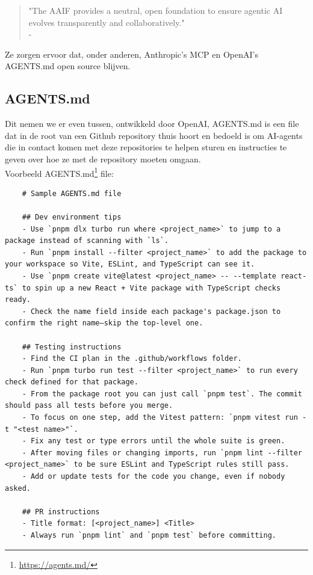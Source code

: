 \begin{quote}
    "The AAIF provides a neutral, open foundation to ensure agentic AI evolves transparently and collaboratively." \\
    - \autocite{LinuxFoundation2025}
\end{quote}

Ze zorgen ervoor dat, onder anderen, Anthropic's MCP en OpenAI's AGENTS.md open source blijven.

\subsection{AGENTS.md}
\label{ssec:agentsdotmd}
Dit nemen we er even tussen, ontwikkeld door OpenAI, AGENTS.md is een file dat in de root van een Github repository thuis hoort en bedoeld is om AI-agents die in contact komen met deze repositories te helpen sturen en instructies te geven over hoe ze met de repository moeten omgaan. \\

Voorbeeld AGENTS.md\footnote{\href{https://agents.md/}{https://agents.md/}} file:

\begin{verbatim}
    # Sample AGENTS.md file
    
    ## Dev environment tips
    - Use `pnpm dlx turbo run where <project_name>` to jump to a package instead of scanning with `ls`.
    - Run `pnpm install --filter <project_name>` to add the package to your workspace so Vite, ESLint, and TypeScript can see it.
    - Use `pnpm create vite@latest <project_name> -- --template react-ts` to spin up a new React + Vite package with TypeScript checks ready.
    - Check the name field inside each package's package.json to confirm the right name—skip the top-level one.
    
    ## Testing instructions
    - Find the CI plan in the .github/workflows folder.
    - Run `pnpm turbo run test --filter <project_name>` to run every check defined for that package.
    - From the package root you can just call `pnpm test`. The commit should pass all tests before you merge.
    - To focus on one step, add the Vitest pattern: `pnpm vitest run -t "<test name>"`.
    - Fix any test or type errors until the whole suite is green.
    - After moving files or changing imports, run `pnpm lint --filter <project_name>` to be sure ESLint and TypeScript rules still pass.
    - Add or update tests for the code you change, even if nobody asked.
    
    ## PR instructions
    - Title format: [<project_name>] <Title>
    - Always run `pnpm lint` and `pnpm test` before committing.
\end{verbatim}

